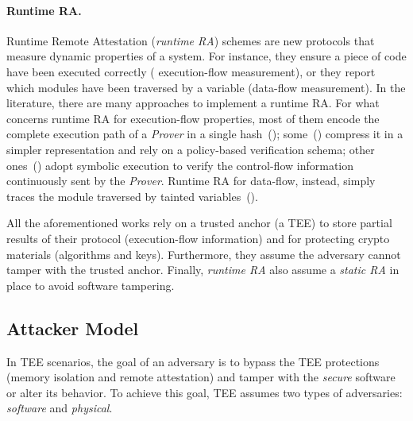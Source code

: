 \paragraph{Runtime RA.}


Runtime Remote Attestation (\emph{runtime RA}) schemes are new protocols that 
measure dynamic properties of a system.
For instance, they ensure a piece of code have been executed correctly (\ie 
execution-flow measurement), or they report which modules have been traversed 
by a variable (\ie data-flow measurement).
In the literature, there are many approaches to implement a runtime RA.
For what concerns runtime RA for execution-flow properties, most of them encode 
the complete execution path of a \emph{Prover} in a single 
hash~(\cite{abera2016c,zeitouni2017atrium,dessouky2017fat}); 
some~(\cite{aberadiat}) compress it in a simpler representation and rely on a 
policy-based verification schema; 
other ones~(\cite{Dessouky:2018:LLH:3240765.3240821}) adopt symbolic execution 
to verify the control-flow information continuously sent by the \emph{Prover}.
Runtime RA for data-flow, instead, simply traces the module traversed by 
tainted variables~(\cite{apex,aberadiat}).

All the aforementioned works rely on a trusted anchor (\ie a TEE) to store 
partial results of their protocol (\eg execution-flow information) and for 
protecting crypto materials (\ie algorithms and keys).
Furthermore, they assume the adversary cannot tamper with the trusted anchor.
Finally, \emph{runtime RA} also assume a \emph{static RA} in place to avoid 
software tampering.

\subsection{Attacker Model}
\label{ssec:attacker-model}

In TEE scenarios, the goal of an adversary is to bypass the TEE protections 
(\ie memory isolation and remote attestation) and tamper with the \emph{secure}
software or alter its behavior.
To achieve this goal, TEE assumes two types of adversaries: \emph{software} and 
\emph{physical}.

